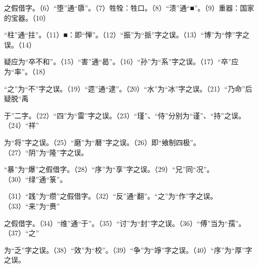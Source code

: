 \documentclass[12pt,UTF8]{ctexbook}
\begin{document}
之假借字。（6）“堕”通“隳”。（7）牲牷：牲口。（8）“溃”通“■”。（9）重器：国家的宝器。（10） 

“柱”通“拄”。（11）■：即“惮”。（12）“振”为“挀”字之误。（13）“博”为“悖”字之误。（14） 

疑应为“卒不和”。（15）“害”通“曷”。（16）“孙”为“系”字之误。（17）“卒”应为“率”。（18） 

“之”为“不”字之误。（19）“遝”通“逮”。（20）“水”为“冰”字之误。（21）“乃命”后疑脱“禹 

于”二字。（22）“四”为“雷”字之误。（23）“瑾”、“侍”分别为“谨”、“持”之误。（24）“祥” 

为“将”字之误。（25）“磨”为“磿”字之误。（26）即“飨制四极”。（27）“阴”为“隆”字之误。 

“暴”为“爆”之假借字。（28）“序”为“享”字之误。（29）“兄”同“况”。（30）“绿”通“箓”。 

（31）“践”为“缵”之假借字。（32）“反”通“翻”。“之”为“作”字之误。（33）“来”为“赉” 

之假借字。（34）“维”通“于”。（35）“讨”为“封”字之误。（36）“傅”当为“孺”。（37）“之” 

为“乏”字之误。（38）“效”为“校”。（39）“争”为“竫”字之误。（40）“序”为“厚”字之误。 
\end{document}
